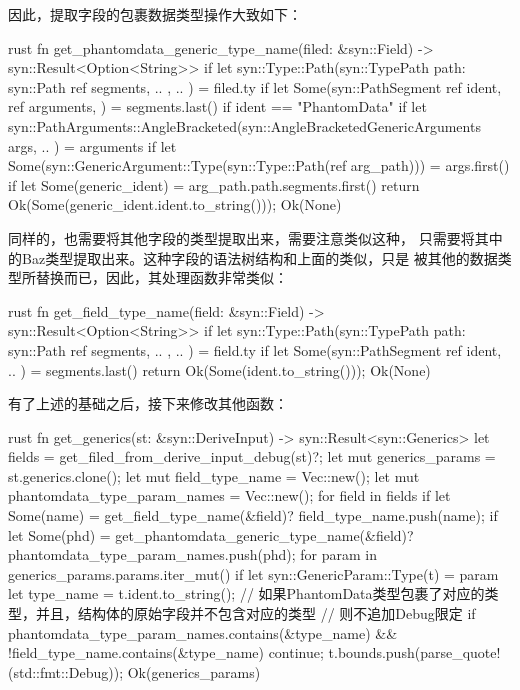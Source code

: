 因此，提取字段的包裹数据类型操作大致如下：
\begin{code-block}{rust}
fn get_phantomdata_generic_type_name(filed: &syn::Field) -> syn::Result<Option<String>> {
    if let syn::Type::Path(syn::TypePath {
        path: syn::Path { ref segments, .. },
        ..
    }) = filed.ty
    {
        if let Some(syn::PathSegment {
            ref ident,
            ref arguments,
        }) = segments.last()
        {
            if ident == "PhantomData" {
                if let syn::PathArguments::AngleBracketed(syn::AngleBracketedGenericArguments {
                    args,
                    ..
                }) = arguments
                {
                    if let Some(syn::GenericArgument::Type(syn::Type::Path(ref arg_path))) =
                        args.first()
                    {
                        if let Some(generic_ident) = arg_path.path.segments.first() {
                            return Ok(Some(generic_ident.ident.to_string()));
                        }
                    }
                }
            }
        }
    }
    Ok(None)
}
\end{code-block}
同样的，也需要将其他字段的类型提取出来，需要注意类似这种，
只需要将其中的Baz类型提取出来。这种字段的语法树结构和上面的类似，只是
被其他的数据类型所替换而已，因此，其处理函数非常类似：
\begin{code-block}{rust}
fn get_field_type_name(field: &syn::Field) -> syn::Result<Option<String>> {
    if let syn::Type::Path(syn::TypePath {
        path: syn::Path { ref segments, .. },
        ..
    }) = field.ty
    {
        if let Some(syn::PathSegment { ref ident, .. }) = segments.last() {
            return Ok(Some(ident.to_string()));
        }
    }
    Ok(None)
}
\end{code-block}

有了上述的基础之后，接下来修改其他函数：
\begin{code-block}{rust}
fn get_generics(st: &syn::DeriveInput) -> syn::Result<syn::Generics> {
    let fields = get_filed_from_derive_input_debug(st)?;
    let mut generics_params = st.generics.clone();
    let mut field_type_name = Vec::new();
    let mut phantomdata_type_param_names = Vec::new();
    for field in fields {
        if let Some(name) = get_field_type_name(&field)? {
            field_type_name.push(name);
        }
        if let Some(phd) = get_phantomdata_generic_type_name(&field)? {
            phantomdata_type_param_names.push(phd);
        }
    }
    for param in generics_params.params.iter_mut() {
        if let syn::GenericParam::Type(t) = param {
            let type_name = t.ident.to_string();
            // 如果PhantomData类型包裹了对应的类型，并且，结构体的原始字段并不包含对应的类型
            // 则不追加Debug限定
            if phantomdata_type_param_names.contains(&type_name)
                && !field_type_name.contains(&type_name)
            {
                continue;
            }
            t.bounds.push(parse_quote!(std::fmt::Debug));
        }
    }
    Ok(generics_params)
}
\end{code-block}

